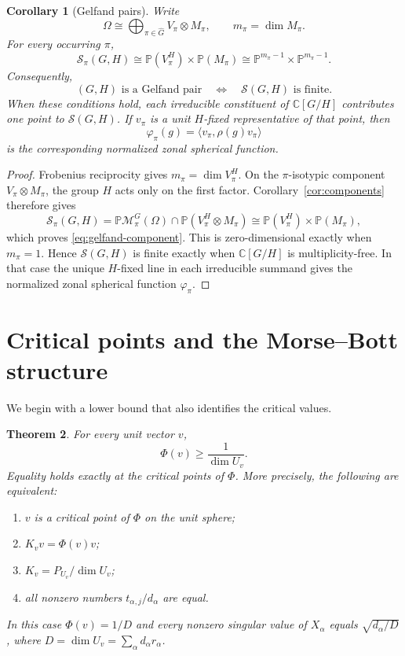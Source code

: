 \documentclass{amsart}
\newtheorem{theorem}{Theorem}
\newtheorem{corollary}[theorem]{Corollary}
\theoremstyle{remark}
\newcommand{\C}{\mathbb C}
\begin{document}
\begin{corollary}[Gelfand pairs]\label{cor:gelfand}
Write
\[
 \Omega\cong\bigoplus_{\pi\in\widehat G}V_\pi\otimes M_\pi,
 \qquad m_\pi=\dim M_\pi.
\]
For every occurring $\pi$,
\begin{equation}\label{eq:gelfand-component}
 \mathcal S_\pi(G,H)
 \cong
 \mathbb P(V_\pi^H)\times\mathbb P(M_\pi)
 \cong
 \mathbb P^{m_\pi-1}\times\mathbb P^{m_\pi-1}.
\end{equation}
Consequently,
\[
 (G,H)\text{ is a Gelfand pair}
 \quad\Longleftrightarrow\quad
 \mathcal S(G,H)\text{ is finite}.
\]
When these conditions hold, each irreducible constituent of $\C[G/H]$ contributes one point to
$\mathcal S(G,H)$. If $v_\pi$ is a unit $H$-fixed representative of that point, then
\[
 \varphi_\pi(g)=\langle v_\pi,\rho(g)v_\pi\rangle
\]
is the corresponding normalized zonal spherical function.
\end{corollary}
 
\begin{proof}
Frobenius reciprocity gives $m_\pi=\dim V_\pi^H$. On the $\pi$-isotypic component
$V_\pi\otimes M_\pi$, the group $H$ acts only on the first factor. Corollary~\ref{cor:components}
therefore gives
\[
 \mathcal S_\pi(G,H)
 =\mathbb P\mathcal M_\pi^G(\Omega)\cap\mathbb P(V_\pi^H\otimes M_\pi)
 \cong\mathbb P(V_\pi^H)\times\mathbb P(M_\pi),
\]
which proves \eqref{eq:gelfand-component}. This is zero-dimensional exactly when $m_\pi=1$. Hence
$\mathcal S(G,H)$ is finite exactly when $\C[G/H]$ is multiplicity-free. In that case the unique
$H$-fixed line in each irreducible summand gives the normalized zonal spherical function $\varphi_\pi$.
\end{proof}
 
\section{Critical points and the Morse--Bott structure}\label{sec:critical}
 
We begin with a lower bound that also identifies the critical values.
 
\begin{theorem}\label{thm:critical}
For every unit vector $v$,
\begin{equation}\label{eq:critical-lower}
 \Phi(v)\ge\frac1{\dim U_v}.
\end{equation}
Equality holds exactly at the critical points of $\Phi$. More precisely, the following are equivalent:
\begin{enumerate}[label=\textup{(\roman*)}]
\item $v$ is a critical point of $\Phi$ on the unit sphere;
\item $K_vv=\Phi(v)v$;
\item $K_v=P_{U_v}/\dim U_v$;
\item all nonzero numbers $t_{\alpha,j}/d_\alpha$ are equal.
\end{enumerate}
In this case $\Phi(v)=1/D$ and every nonzero singular value of $X_\alpha$ equals
$\sqrt{d_\alpha/D}$, where $D=\dim U_v=\sum_\alpha d_\alpha r_\alpha$.
\end{theorem}
 
\end{document}
